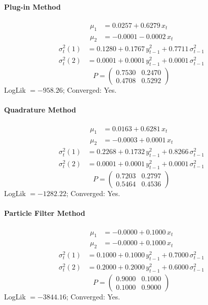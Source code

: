 \documentclass[11pt, a4paper]{article}
\begin{document}
\paragraph{Plug-in Method}
\begin{align}
\mu_{1} &= 0.0257 + 0.6279\, x_t \\
\mu_{2} &= -0.0001 -0.0002\, x_t
\end{align}
\begin{align}
\sigma^2_{t}(1) &= 0.1280 + 0.1767\, y_{t-1}^2 + 0.7711\, \sigma^2_{t-1} \\
\sigma^2_{t}(2) &= 0.0001 + 0.0001\, y_{t-1}^2 + 0.0001\, \sigma^2_{t-1}
\end{align}
\begin{equation}
P = \begin{pmatrix} 0.7530 & 0.2470 \\ 0.4708 & 0.5292 \end{pmatrix}
\end{equation}
LogLik $= -958.26$; Converged: Yes.

\paragraph{Quadrature Method}
\begin{align}
\mu_{1} &= 0.0163 + 0.6281\, x_t \\
\mu_{2} &= -0.0003 + 0.0001\, x_t
\end{align}
\begin{align}
\sigma^2_{t}(1) &= 0.2268 + 0.1732\, y_{t-1}^2 + 0.8266\, \sigma^2_{t-1} \\
\sigma^2_{t}(2) &= 0.0001 + 0.0001\, y_{t-1}^2 + 0.0001\, \sigma^2_{t-1}
\end{align}
\begin{equation}
P = \begin{pmatrix} 0.7203 & 0.2797 \\ 0.5464 & 0.4536 \end{pmatrix}
\end{equation}
LogLik $= -1282.22$; Converged: Yes.

\paragraph{Particle Filter Method}
\begin{align}
\mu_{1} &= -0.0000 + 0.1000\, x_t \\
\mu_{2} &= -0.0000 + 0.1000\, x_t
\end{align}
\begin{align}
\sigma^2_{t}(1) &= 0.1000 + 0.1000\, y_{t-1}^2 + 0.7000\, \sigma^2_{t-1} \\
\sigma^2_{t}(2) &= 0.2000 + 0.2000\, y_{t-1}^2 + 0.6000\, \sigma^2_{t-1}
\end{align}
\begin{equation}
P = \begin{pmatrix} 0.9000 & 0.1000 \\ 0.1000 & 0.9000 \end{pmatrix}
\end{equation}
LogLik $= -3844.16$; Converged: Yes.
\end{document}
